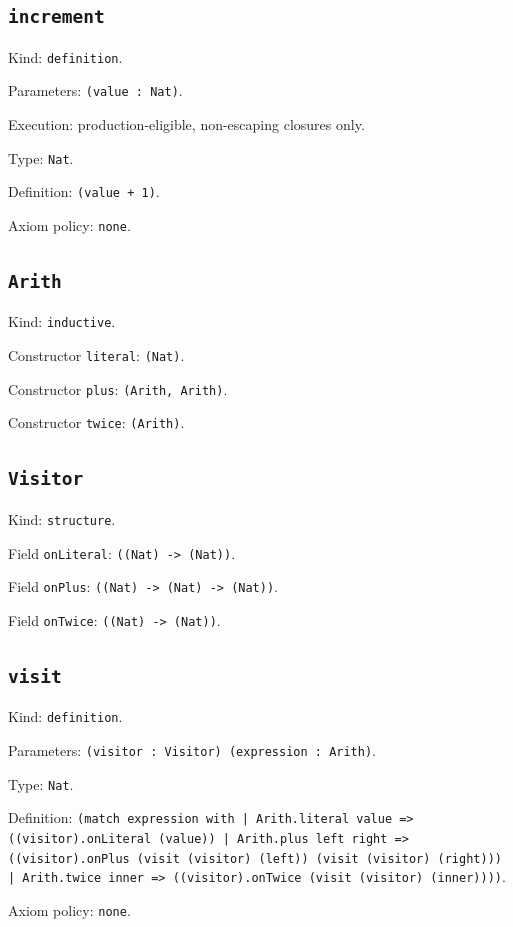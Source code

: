 \documentclass[11pt]{article}
\begin{document}
\subsection*{\texttt{increment}}
\noindent Kind: \texttt{definition}.\par
\noindent Parameters: \texttt{(value : Nat)}.\par
\noindent Execution: production-eligible, non-escaping closures only.\par
\noindent Type: \texttt{Nat}.\par
\noindent Definition: \texttt{(value + 1)}.\par
\noindent Axiom policy: \texttt{none}.\par
\subsection*{\texttt{Arith}}
\noindent Kind: \texttt{inductive}.\par
\noindent Constructor \texttt{literal}: \texttt{(Nat)}.\par
\noindent Constructor \texttt{plus}: \texttt{(Arith, Arith)}.\par
\noindent Constructor \texttt{twice}: \texttt{(Arith)}.\par
\subsection*{\texttt{Visitor}}
\noindent Kind: \texttt{structure}.\par
\noindent Field \texttt{onLiteral}: \texttt{((Nat) -> (Nat))}.\par
\noindent Field \texttt{onPlus}: \texttt{((Nat) -> (Nat) -> (Nat))}.\par
\noindent Field \texttt{onTwice}: \texttt{((Nat) -> (Nat))}.\par
\subsection*{\texttt{visit}}
\noindent Kind: \texttt{definition}.\par
\noindent Parameters: \texttt{(visitor : Visitor) (expression : Arith)}.\par
\noindent Type: \texttt{Nat}.\par
\noindent Definition: \texttt{(match expression with | Arith.literal value => ((visitor).onLiteral (value)) | Arith.plus left right => ((visitor).onPlus (visit (visitor) (left)) (visit (visitor) (right))) | Arith.twice inner => ((visitor).onTwice (visit (visitor) (inner))))}.\par
\noindent Axiom policy: \texttt{none}.\par
\end{document}
